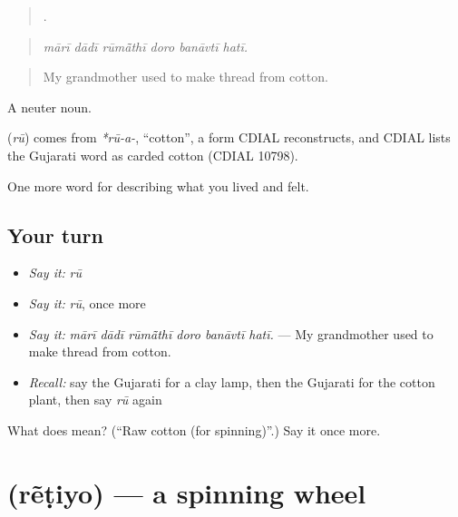 \begin{quote}
     .
\end{quote}

\begin{quote}
\emph{mārī dādī rūmā̃thī doro banāvtī hatī.}
\end{quote}

\begin{quote}
My grandmother used to make thread from cotton.
\end{quote}

A neuter noun.

\begin{cousinweb}
\textbf{} (\emph{rū}) comes from \emph{*rū-a-}, \textquotedblleft{}cotton\textquotedblright{}, a form CDIAL reconstructs, and CDIAL lists the Gujarati word as carded cotton (CDIAL 10798).
\end{cousinweb}

\begin{grammarlens}[title={What you've built}]
One more word for describing what you lived and felt.
\end{grammarlens}

\subsection*{Your turn}
\begin{itemize}
\raggedright
  \item \emph{Say it:} \emph{rū}
  \item \emph{Say it:} \emph{rū}, once more
  \item \emph{Say it:} \emph{mārī dādī rūmā̃thī doro banāvtī hatī.} — My grandmother used to make thread from cotton.
  \item \emph{Recall:} say the Gujarati for a clay lamp, then the Gujarati for the cotton plant, then say \emph{rū} again
\end{itemize}

\begin{tcolorbox}[breakable,colback=teal!4,colframe=teal!35!black,title={Before you move on}]
What does  mean? (\textquotedblleft{}Raw cotton (for spinning)\textquotedblright{}.) Say it once more.
\end{tcolorbox}
\section[\texorpdfstring{\gu{રેંટિયો} (rẽṭiyo)}{રેંટિયો (rẽṭiyo)}]{ (rẽṭiyo) — a spinning wheel}

